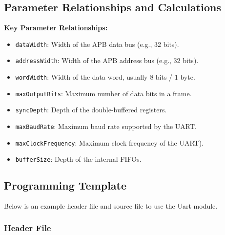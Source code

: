 \subsection{Parameter Relationships and Calculations}

\textbf{Key Parameter Relationships:}
\begin{itemize}
    \item \texttt{dataWidth}: Width of the APB data bus (e.g., 32 bits).
    \item \texttt{addressWidth}: Width of the APB address bus (e.g., 32 bits).
    \item \texttt{wordWidth}: Width of the data word, usually 8 bits / 1 byte.
    \item \texttt{maxOutputBits}: Maximum number of data bits in a frame.
    \item \texttt{syncDepth}: Depth of the double-buffered registers.
    \item \texttt{maxBaudRate}: Maximum baud rate supported by the UART.
    \item \texttt{maxClockFrequency}: Maximum clock frequency of the UART).
    \item \texttt{bufferSize}: Depth of the internal FIFOs.
\end{itemize}

\subsection{Programming Template}

Below is an example header file and source file to use the Uart module.

\subsubsection{Header File}

